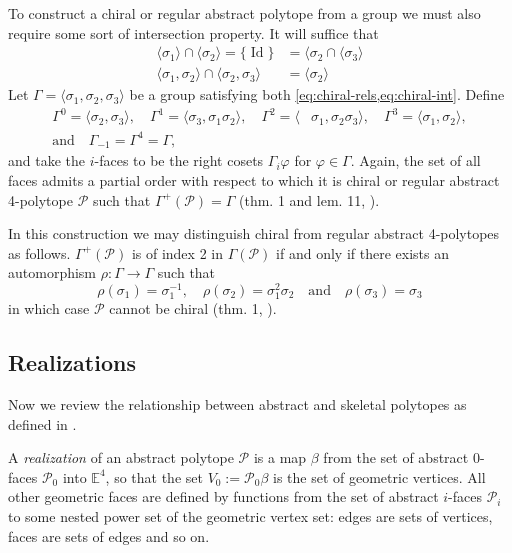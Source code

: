 \documentclass{article}
\theoremstyle{definition}
\newcommand{\E}{\mathbb{E}}
\newcommand{\p}{\mathcal{P}}
\DeclareMathOperator{\Id}{Id}
\begin{document}
	To construct a chiral or regular abstract polytope from a group we must also require some sort of intersection property. It will suffice that
	\begin{equation}\label{eq:chiral-int}
		\begin{aligned}
			\langle\sigma_1\rangle\cap\langle\sigma_2\rangle=\{\Id\}&=\langle\sigma_2\cap\langle\sigma_3\rangle\\
			\langle\sigma_1,\sigma_2\rangle\cap\langle\sigma_2,\sigma_3\rangle&=\langle\sigma_2\rangle
		\end{aligned}
	\end{equation}
	Let $\Gamma=\langle \sigma_1,\sigma_2,\sigma_3\rangle$ be a group satisfying both \cref{eq:chiral-rels,eq:chiral-int}. Define
	\begin{align*}
		\Gamma^0=\langle\sigma_2,\sigma_3\rangle,\quad
		\Gamma^1=\langle \sigma_3,\sigma_1\sigma_2\rangle,\quad
		\Gamma^2=\langle &\sigma_1,\sigma_2\sigma_3\rangle,\quad
		\Gamma^3=\langle \sigma_1,\sigma_2\rangle,\\
		\text{and}\quad\Gamma_{-1}=\Gamma^4=\Gamma,
	\end{align*}
	and take the $i$-faces to be the right cosets $\Gamma_i\varphi$ for $\varphi\in\Gamma$. Again, the set of all faces admits a partial order with respect to which it is chiral or regular abstract 4-polytope $\p$ such that $\Gamma^+(\p)=\Gamma$ (thm. 1 and lem. 11, \cite{schulte-chiral}).
	
	In this construction we may distinguish chiral from regular abstract 4-polytopes as follows. $\Gamma^+(\p)$ is of index 2 in $\Gamma(\p)$ if and only if there exists an automorphism $\rho:\Gamma\to \Gamma$ such that
	\begin{equation}\label{eq:combinatorially-chiral}
		\rho(\sigma_1)=\sigma_1^{-1},\quad \rho(\sigma_2)=\sigma_1^2\sigma_2\quad\text{and}\quad \rho(\sigma_3)=\sigma_3
\end{equation}
	in which case $\p$ cannot be chiral (thm. 1, \cite{schulte-chiral}).

\vspace{10pt}

	\subsection{Realizations}\label{subsec:realizations}
	Now we review the relationship between abstract and skeletal polytopes as defined in .
	
	A \textit{realization} of an abstract polytope $\p$ is a map $\beta$ from the set of abstract 0-faces $\p_0$ into $\E^4$, so that the set $V_0:=\p_0\beta$ is the set of geometric vertices. All other geometric faces are defined by functions from the set of abstract $i$-faces $\p_i$ to some nested power set of the geometric vertex set: edges are sets of vertices, faces are sets of edges and so on.
	
\end{document}
